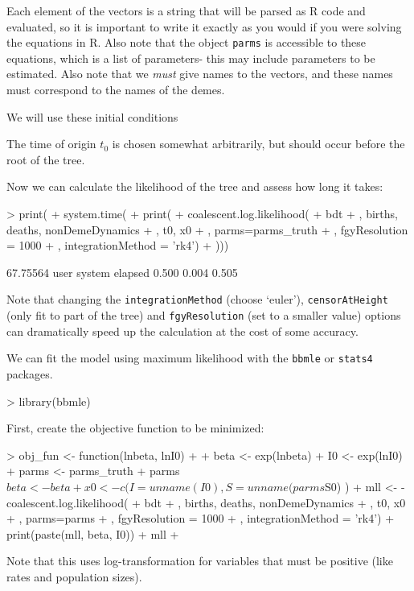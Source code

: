 \documentclass{article}
\begin{document}
Each element of the vectors is a string that will be parsed as R code and evaluated, so it is important to write it exactly as you would if you were solving the equations in R.
Also note that the object \texttt{parms} is accessible to these equations, which is a list of parameters- this may include parameters to be estimated.
Also note that we \emph{must} give names to the vectors, and these names must correspond to the names of the demes. 

We will use these initial conditions
\begin{Schunk}
\end{Schunk}
The time of origin $t_0$ is chosen somewhat arbitrarily, but should occur before the root of the tree. 

Now we can calculate the likelihood of the tree and assess how long it takes:
\begin{Schunk}
\begin{Sinput}
> print( 
+ system.time( 
+ print(
+   coalescent.log.likelihood(
+     bdt
+     , births, deaths, nonDemeDynamics
+     , t0, x0
+     , parms=parms_truth
+     , fgyResolution = 1000
+     , integrationMethod = 'rk4')
+ )))
\end{Sinput}
\begin{Soutput}
[1] 67.75564
   user  system elapsed 
  0.500   0.004   0.505 
\end{Soutput}
\end{Schunk}
Note that changing the \texttt{integrationMethod} (choose `euler'), \texttt{censorAtHeight} (only fit to part of the tree) and \texttt{fgyResolution} (set to a smaller value) options can dramatically speed up the calculation at the cost of some accuracy. 

We can fit the model using maximum likelihood with the \texttt{bbmle} or \texttt{stats4} packages. 
\begin{Schunk}
\begin{Sinput}
> 	library(bbmle)
\end{Sinput}
\end{Schunk}
First, create the objective function to be minimized:
\begin{Schunk}
\begin{Sinput}
> obj_fun <- function(lnbeta, lnI0)
+ {
+ 	beta <- exp(lnbeta)
+ 	I0 <- exp(lnI0)
+ 	parms <- parms_truth
+ 	parms$beta <- beta
+ 	x0 <- c(I=unname(I0), S = unname(parms$S0) )
+ 	mll <- -coalescent.log.likelihood(
+ 		bdt
+ 		, births, deaths, nonDemeDynamics
+ 		,  t0, x0
+ 		, parms=parms
+ 		, fgyResolution = 1000
+ 		, integrationMethod = 'rk4')
+ 	print(paste(mll, beta, I0))
+ 	mll
+ }
\end{Sinput}
\end{Schunk}
Note that this uses log-transformation for variables that must be positive (like rates and population sizes).
\end{document}
